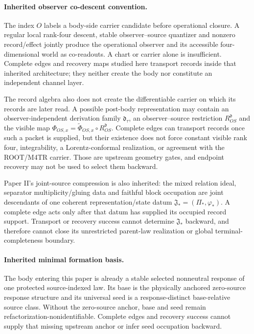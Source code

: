 \documentclass[11pt]{article}
\begin{document}
\paragraph{Inherited observer co-descent convention.}
The index $O$ labels a body-side carrier candidate before operational
closure.  A regular local rank-four descent, stable observer--source quantizer
and nonzero record/effect jointly produce the operational observer and its
accessible four-dimensional world as co-readouts.  A chart or carrier alone
is insufficient.  Complete edges and recovery maps studied here transport
records inside that inherited architecture; they neither create the body nor
constitute an independent channel layer.

The record algebra also does not create the differentiable carrier on which
its records are later read.  A possible post-body representation may contain
an observer-independent derivation family $\mathfrak d_\tau$, an
observer--source restriction $R^{\mathfrak d}_{OS}$ and the visible map
$\Phi_{OS,x}=\widetilde\Phi_{OS,x}\circ R^{\mathfrak d}_{OS}$.  Complete
edges can transport records once such a packet is supplied, but their
existence does not force constant visible rank four, integrability, a
Lorentz-conformal realization, or agreement with the ROOT/M4TR carrier.
Those are upstream geometry gates, and endpoint recovery may not be used to
select them backward.

Paper II's joint-source compression is also inherited: the mixed relation
ideal, separator multiplicity/gluing data and faithful block occupation are
joint descendants of one coherent representation/state datum
$\mathfrak J_*=(\Pi_*,\varphi_*)$.  A complete edge acts only after that datum
has supplied its occupied record support.  Transport or recovery success
cannot determine $\mathfrak J_*$ backward, and therefore cannot close its
unrestricted parent-law realization or global terminal-completeness boundary.

\paragraph{Inherited minimal formation basis.}
The body entering this paper is already a stable selected nonneutral response
of one protected source-indexed law.  Its base is the physically anchored
zero-source response structure and its universal seed is a response-distinct
base-relative source class.  Without the zero-source anchor, base and seed
remain refactorization-nonidentifiable.  Complete edges and recovery success
cannot supply that missing upstream anchor or infer seed occupation backward.
\end{document}
